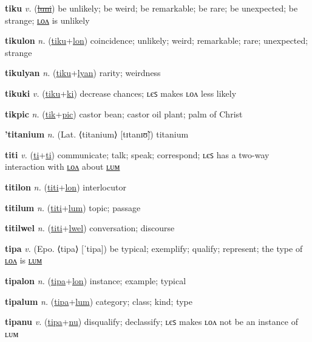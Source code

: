 \textbf{\hypertarget{tiku}{tiku}} \textit{v.} (\hyperlink{luni}{\sout{luni}})
be unlikely; be weird; be remarkable; be rare; be unexpected; be strange; \hyperlink{tikulon}{ʟᴏᴧ} is unlikely

\textbf{\hypertarget{tikulon}{tikulon}} \textit{n.} (\hyperlink{tiku}{tiku}+\allowbreak \hyperlink{lon}{lon})
coincidence; unlikely; weird; remarkable; rare; unexpected; strange

\textbf{\hypertarget{tikulyan}{tikulyan}} \textit{n.} (\hyperlink{tiku}{tiku}+\allowbreak \hyperlink{lyan}{lyan})
rarity; weirdness

\textbf{\hypertarget{tikuki}{tikuki}} \textit{v.} (\hyperlink{tiku}{tiku}+\allowbreak \hyperlink{ki}{ki})
decrease chances; ʟєꜱ makes ʟᴏᴧ less likely

\textbf{\hypertarget{tikpic}{tikpic}} \textit{n.} (\hyperlink{tik}{tik}+\allowbreak \hyperlink{pic}{pic})
castor bean; castor oil plant; palm of Christ

\textbf{\hypertarget{'titanium}{'titanium}} \textit{n.} (Lat. ⟨titanium⟩ [tɪtanɪʊ̃])
titanium

\textbf{\hypertarget{titi}{titi}} \textit{v.} (\hyperlink{ti}{ti}+\allowbreak \hyperlink{ti}{ti})
communicate; talk; speak; correspond; ʟєꜱ has a two-way interaction with \hyperlink{titilon}{ʟᴏᴧ} about \hyperlink{titilum}{ʟᴜᴍ}

\textbf{\hypertarget{titilon}{titilon}} \textit{n.} (\hyperlink{titi}{titi}+\allowbreak \hyperlink{lon}{lon})
interlocutor

\textbf{\hypertarget{titilum}{titilum}} \textit{n.} (\hyperlink{titi}{titi}+\allowbreak \hyperlink{lum}{lum})
topic; passage

\textbf{\hypertarget{titilwel}{titilwel}} \textit{n.} (\hyperlink{titi}{titi}+\allowbreak \hyperlink{lwel}{lwel})
conversation; discourse

\textbf{\hypertarget{tipa}{tipa}} \textit{v.} (Epo. ⟨tipa⟩ [ˈtipa])
be typical; exemplify; qualify; represent; the type of \hyperlink{tipalon}{ʟᴏᴧ} is \hyperlink{tipalum}{ʟᴜᴍ}

\textbf{\hypertarget{tipalon}{tipalon}} \textit{n.} (\hyperlink{tipa}{tipa}+\allowbreak \hyperlink{lon}{lon})
instance; example; typical

\textbf{\hypertarget{tipalum}{tipalum}} \textit{n.} (\hyperlink{tipa}{tipa}+\allowbreak \hyperlink{lum}{lum})
category; class; kind; type

\textbf{\hypertarget{tipanu}{tipanu}} \textit{v.} (\hyperlink{tipa}{tipa}+\allowbreak \hyperlink{nu}{nu})
disqualify; declassify; ʟєꜱ makes ʟᴏᴧ not be an instance of ʟᴜᴍ

